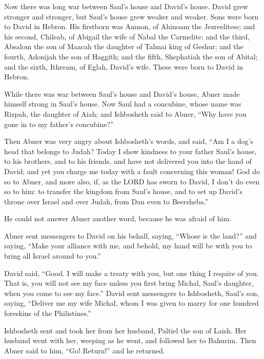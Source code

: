  Now there was long war between Saul's house and David's
house. David grew stronger and stronger, but Saul's house grew weaker
and weaker.  Sons were born to David in Hebron. His
firstborn was Amnon, of Ahinoam the Jezreelitess;  and his
second, Chileab, of Abigail the wife of Nabal the Carmelite; and the
third, Absalom the son of Maacah the daughter of Talmai king of Geshur;
 and the fourth, Adonijah the son of Haggith; and the
fifth, Shephatiah the son of Abital;  and the sixth,
Ithream, of Eglah, David's wife. These were born to David in Hebron.

 While there was war between Saul's house and David's
house, Abner made himself strong in Saul's house.  Now
Saul had a concubine, whose name was Rizpah, the daughter of Aiah; and
Ishbosheth said to Abner, ``Why have you gone in to my father's
concubine?''

 Then Abner was very angry about Ishbosheth's words, and
said, ``Am I a dog's head that belongs to Judah? Today I show kindness
to your father Saul's house, to his brothers, and to his friends, and
have not delivered you into the hand of David; and yet you charge me
today with a fault concerning this woman!  God do so to
Abner, and more also, if, as the LORD has sworn to David, I don't do
even so to him:  to transfer the kingdom from Saul's
house, and to set up David's throne over Israel and over Judah, from Dan
even to Beersheba.''

 He could not answer Abner another word, because he was
afraid of him.

 Abner sent messengers to David on his behalf, saying,
``Whose is the land?'' and saying, ``Make your alliance with me, and
behold, my hand will be with you to bring all Israel around to you.''

 David said, ``Good. I will make a treaty with you, but
one thing I require of you. That is, you will not see my face unless you
first bring Michal, Saul's daughter, when you come to see my face.''
 David sent messengers to Ishbosheth, Saul's son, saying,
``Deliver me my wife Michal, whom I was given to marry for one hundred
foreskins of the Philistines.''

 Ishbosheth sent and took her from her husband, Paltiel
the son of Laish.  Her husband went with her, weeping as
he went, and followed her to Bahurim. Then Abner said to him, ``Go!
Return!'' and he returned.


